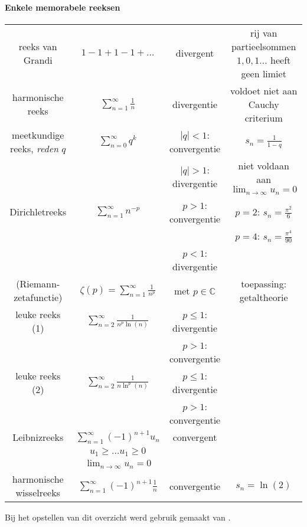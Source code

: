 \documentclass[10pt,a4paper]{article}
\begin{document}
\paragraph{Enkele memorabele reeksen}
\begin{center}
\centering
{\tabulinesep=1.5mm
\begin{tabu}{|c|c|c|c|} 
\hline
& & & \\ \hline
reeks van Grandi 
	& $1-1 + 1-1 + \hdots $ 
	& divergent 
	& rij van partieelsommen $1,0,1 \hdots $ heeft geen limiet \\ \hline
	
harmonische reeks 
	& $\sum_{n=1}^{\infty} \frac{1}{n}$ 
	& divergentie 
	& voldoet niet aan Cauchy criterium \\ \hline
	
meetkundige reeks, \textit{reden} $q$ 
	& $\sum_{n=0}^{\infty} q^k$ 
	& $|q| < 1$: convergentie & $s_n = \frac{1}{1-q}$ \\ 
	
	& & $|q| >1$: divergentie 
	& niet voldaan aan $\lim_{n\to \infty} u_n = 0$ \\ \hline
	
Dirichletreeks 
	& $\sum_{n=1}^{\infty} n^{-p}$ 
	& $p >1$: convergentie 
	& $p=2$: $s_n = \frac{\pi^2}{6}$ \\ 
	
	& & & $p=4$: $s_n = \frac{\pi^4}{90}$ \\ 
	
	& & $p < 1$: divergentie & \\ \hline

(Riemann-zetafunctie) 
	& $\zeta(p) = \sum_{n=1}^{\infty} \frac{1}{n^p}$ 
	& met $p \in \mathbb{C}$ 
	& toepassing: getaltheorie  \\ \hline

leuke reeks (1)
	& $\sum_{n=2}^{\infty} \frac{1}{n^p \ln(n)}$ 
	& $p \leq 1$: divergentie & \\
	
	& & $p>1$: convergentie & \\ \hline

leuke reeks (2)
	& $\sum_{n=2}^{\infty} \frac{1}{n \ln^p(n)}$ 
	& $p \leq 1$: divergentie & \\
	
	& & $p>1$: convergentie & \\ \hline

 Leibnizreeks 
	& $\sum_{n=1}^{\infty} (-1)^{n+1} u_n$ 
	& convergent 
	& \\ 
		
	& $u_1 \geq \hdots u_1 \geq 0$  
	& & \\
	
	& $\lim_{n \to \infty} u_n = 0$ 
	& & \\ \hline

harmonische wisselreeks 
	& $\sum_{n=1}^{\infty} (-1)^{n+1} \frac{1}{n}$ 
	& convergentie 
	& $s_n = \ln(2)$ \\ \hline

\end{tabu}}
\end{center}

Bij het opstellen van dit overzicht werd gebruik gemaakt van \cite{VandewalleStefan2017AIS}.




\end{document}
